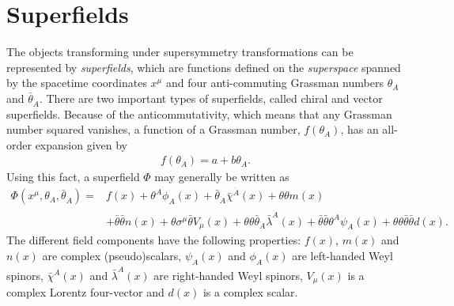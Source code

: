 \documentclass[twoside,english]{uiofysmaster}
\begin{document}
\section{Superfields}
The objects transforming under supersymmetry transformations can be represented by {\it superfields}, which are functions defined on the {\it superspace} spanned by the spacetime coordinates $x^\mu$ and four anti-commuting Grassman numbers $\theta_A$ and $\bar\theta_{\dot A}$.  There are two important types of superfields, called chiral and vector superfields. Because of the anticommutativity, which means that any Grassman number squared vanishes, a function of a Grassman number, $f(\theta_A)$, has an all-order expansion given by
\begin{align}
	f(\theta_A) = a + b\theta_A.
\end{align}
Using this fact, a superfield $\Phi$ may generally be written as
\begin{align}
	\Phi\left(x^\mu, \theta_A, \bar\theta_{\dot A}\right) = &f(x) + \theta^A\phi_A(x) + \bar\theta_{\dot A}\bar\chi^{\dot A}(x) + \theta \theta m(x)\\
	 &+ \bar\theta \bar\theta n(x) + \theta\sigma^\mu \bar\theta V_\mu(x) + \theta\theta\bar\theta_{\dot A}\bar\lambda^{\dot A}(x) + \bar\theta \bar\theta \theta^A \psi_A(x) + \theta \theta \bar\theta \bar\theta d(x).\nonumber
\end{align}
The different field components have the following properties: $f(x)$, $m(x)$ and $n(x)$ are complex (pseudo)scalars, $\psi_A(x)$ and $\phi_A(x)$ are left-handed Weyl spinors, $\bar\chi^{\dot A}(x)$ and $\bar\lambda^{\dot A}(x)$ are right-handed Weyl spinors, $V_\mu (x)$ is a complex Lorentz four-vector and $d(x)$ is a complex scalar.
\end{document}

